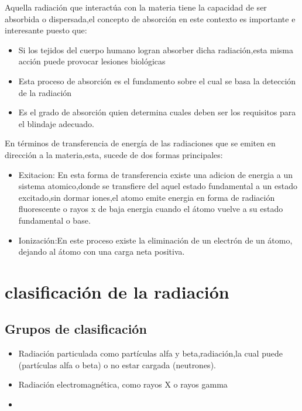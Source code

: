 \documentclass[12pt,fleqn]{book} %
\numberwithin{equation}{section} %
\numberwithin{figure}{section} %
\numberwithin{table}{section} %
\begin{document}
Aquella radiación que interactúa con la materia tiene la capacidad de ser absorbida o dispersada,el concepto de absorción en este contexto es importante e interesante puesto que:
\begin{itemize}
 \item Si los tejidos del cuerpo humano logran absorber dicha radiación,esta misma acción puede provocar lesiones biológicas
 \item Esta proceso de absorción es el fundamento sobre el cual se basa la detección de la radiación
 \item Es el grado de absorción quien determina cuales deben ser los requisitos para el blindaje adecuado.  
\end{itemize}
En términos de transferencia de energía de las radiaciones que se emiten en dirección a la materia,esta, sucede de dos formas principales:

\begin{itemize}
\item Exitacion: En esta forma de transferencia existe una adicion de energia a un sistema atomico,donde se transfiere del aquel estado fundamental a un estado excitado,sin dormar iones,el atomo emite energia en forma de radiación fluorescente o rayos x de baja energia cuando el átomo vuelve a su estado fundamental o base.
\item Ionización:En este proceso existe  la eliminación de un electrón de un átomo, dejando al átomo con una carga neta positiva.
\end{itemize}
\section{clasificación de la radiación}
\subsection{Grupos de clasificación}

\begin{itemize}
\item Radiación particulada como partículas alfa y beta,radiación,la cual puede  (partículas alfa o beta) o no estar cargada (neutrones).
\item Radiación electromagnética, como rayos X o rayos gamma 
\item 
 \end{itemize}
\end{document}
